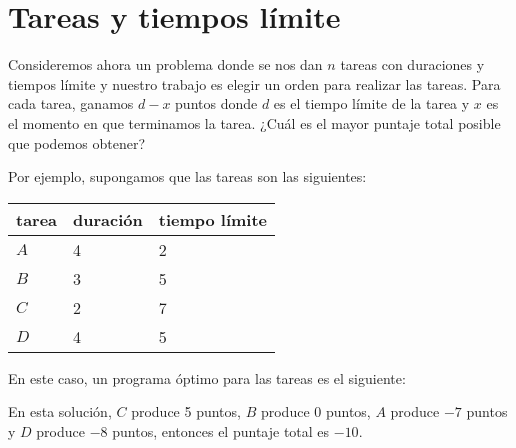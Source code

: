 \section{Tareas y tiempos límite}

Consideremos ahora un problema donde
se nos dan $n$ tareas con duraciones y tiempos límite
y nuestro trabajo es elegir un orden para realizar las tareas.
Para cada tarea, ganamos $d-x$ puntos
donde $d$ es el tiempo límite de la tarea
y $x$ es el momento en que terminamos la tarea.
¿Cuál es el mayor puntaje total posible
que podemos obtener?

Por ejemplo, supongamos que las tareas son las siguientes:
\begin{center}
  \begin{tabular}{lll}
    tarea & duración & tiempo límite \\
    \hline
    $A$   & 4        & 2             \\
    $B$   & 3        & 5             \\
    $C$   & 2        & 7             \\
    $D$   & 4        & 5             \\
  \end{tabular}
\end{center}
En este caso, un programa óptimo para las tareas
es el siguiente:
\begin{center}
\end{center}
En esta solución, $C$ produce 5 puntos,
$B$ produce 0 puntos, $A$ produce $-7$ puntos
y $D$ produce $-8$ puntos,
entonces el puntaje total es $-10$.

